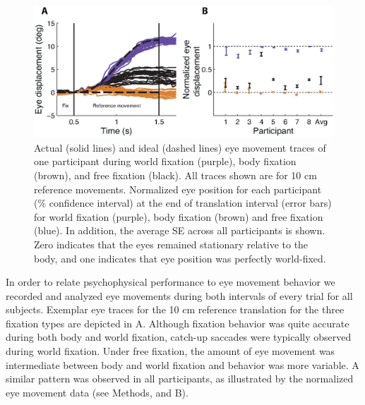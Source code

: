 \begin{figure}
    \includegraphics[width=1.0\textwidth]{src/paper3/figure3.eps}

    \caption{ Actual (solid lines) and ideal (dashed lines) eye movement traces of one participant during world fixation (purple), body fixation (brown), and free fixation (black). All traces shown are for 10 \si{\centi\metre} reference movements.  Normalized eye position for each participant (\% confidence interval) at the end of translation interval (error bars) for world fixation (purple), body fixation (brown) and free fixation (blue). In addition, the average {\textpm}SE across all participants is shown. Zero indicates that the eyes remained stationary relative to the body, and one indicates that eye position was perfectly world-fixed.}
    \label{p3:fig3}    
\end{figure}

In order to relate psychophysical performance to eye movement behavior we recorded and analyzed eye movements during both intervals of every trial for all subjects. Exemplar eye traces for the 10 \si{\centi\metre} reference translation for the three fixation types are depicted in A. Although fixation behavior was quite accurate during both body and world fixation, catch-up saccades were typically observed during world fixation. Under free fixation, the amount of eye movement was intermediate between body and world fixation and behavior was more variable. A similar pattern was observed in all participants, as illustrated by the normalized eye movement data (see Methods, and B).

